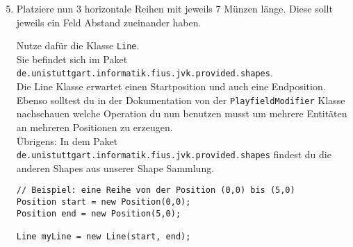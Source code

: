 \begin{enumerate} \setcounter{enumi}{4}
    \item Platziere nun 3 horizontale Reihen mit jeweils 7 Münzen länge.
        Diese sollt jeweils ein Feld Abstand zueinander haben.

        Nutze dafür die Klasse \lstinline{Line}.\\
        Sie befindet sich im Paket \texttt{de.unistuttgart.informatik.fius.jvk.provided.shapes}.\\

        Die Line Klasse erwartet einen Startposition und auch eine Endposition.\\
        Ebenso solltest du in der Dokumentation von der \lstinline{PlayfieldModifier} Klasse nachschauen welche Operation du nun benutzen musst um mehrere Entitäten an mehreren Positionen zu erzeugen.\\

        Übrigens: In dem Paket \texttt{de.unistuttgart.informatik.fius.jvk.provided.shapes} findest du die anderen Shapes aus unserer Shape Sammlung.

    \begin{lstlisting}
// Beispiel: eine Reihe von der Position (0,0) bis (5,0)
Position start = new Position(0,0);
Position end = new Position(5,0);

Line myLine = new Line(start, end);
    \end{lstlisting}

\end{enumerate}
